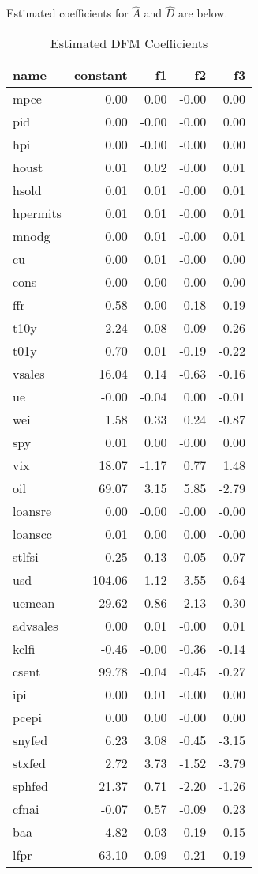 \documentclass[11pt, letterpaper]{article}\usepackage[]{graphicx}\usepackage[]{color}
\begin{document}
Estimated coefficients for $\widehat{A}$ and $\widehat{D}$ are below.
\begin{table}[H]
\centering
\begingroup\footnotesize
\begin{tabular}{lrrrr}
  \hline
name & constant & f1 & f2 & f3 \\ 
  \hline
mpce & 0.00 & 0.00 & -0.00 & 0.00 \\ 
  pid & 0.00 & -0.00 & -0.00 & 0.00 \\ 
  hpi & 0.00 & -0.00 & -0.00 & 0.00 \\ 
  houst & 0.01 & 0.02 & -0.00 & 0.01 \\ 
  hsold & 0.01 & 0.01 & -0.00 & 0.01 \\ 
  hpermits & 0.01 & 0.01 & -0.00 & 0.01 \\ 
  mnodg & 0.00 & 0.01 & -0.00 & 0.01 \\ 
  cu & 0.00 & 0.01 & -0.00 & 0.00 \\ 
  cons & 0.00 & 0.00 & -0.00 & 0.00 \\ 
  ffr & 0.58 & 0.00 & -0.18 & -0.19 \\ 
  t10y & 2.24 & 0.08 & 0.09 & -0.26 \\ 
  t01y & 0.70 & 0.01 & -0.19 & -0.22 \\ 
  vsales & 16.04 & 0.14 & -0.63 & -0.16 \\ 
  ue & -0.00 & -0.04 & 0.00 & -0.01 \\ 
  wei & 1.58 & 0.33 & 0.24 & -0.87 \\ 
  spy & 0.01 & 0.00 & -0.00 & 0.00 \\ 
  vix & 18.07 & -1.17 & 0.77 & 1.48 \\ 
  oil & 69.07 & 3.15 & 5.85 & -2.79 \\ 
  loansre & 0.00 & -0.00 & -0.00 & -0.00 \\ 
  loanscc & 0.01 & 0.00 & 0.00 & -0.00 \\ 
  stlfsi & -0.25 & -0.13 & 0.05 & 0.07 \\ 
  usd & 104.06 & -1.12 & -3.55 & 0.64 \\ 
  uemean & 29.62 & 0.86 & 2.13 & -0.30 \\ 
  advsales & 0.00 & 0.01 & -0.00 & 0.01 \\ 
  kclfi & -0.46 & -0.00 & -0.36 & -0.14 \\ 
  csent & 99.78 & -0.04 & -0.45 & -0.27 \\ 
  ipi & 0.00 & 0.01 & -0.00 & 0.00 \\ 
  pcepi & 0.00 & 0.00 & -0.00 & 0.00 \\ 
  snyfed & 6.23 & 3.08 & -0.45 & -3.15 \\ 
  stxfed & 2.72 & 3.73 & -1.52 & -3.79 \\ 
  sphfed & 21.37 & 0.71 & -2.20 & -1.26 \\ 
  cfnai & -0.07 & 0.57 & -0.09 & 0.23 \\ 
  baa & 4.82 & 0.03 & 0.19 & -0.15 \\ 
  lfpr & 63.10 & 0.09 & 0.21 & -0.19 \\ 
   \hline
\end{tabular}
\endgroup
\caption{Estimated DFM Coefficients} 
\end{table}
\end{document}
